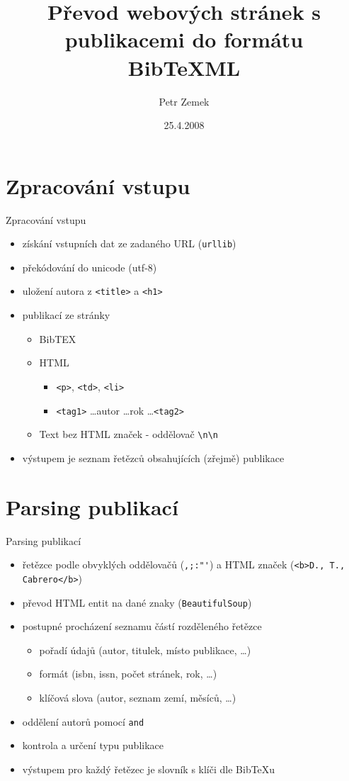 \documentclass{beamer}
\title[Jak jsem řešil projekt do předmětu ISJ \hspace*{7em} \insertframenumber/
\inserttotalframenumber]{Převod webových stránek s publikacemi do formátu BibTeXML}
\author[Petr Zemek]
{
	Petr Zemek
}
\institute
{
	Aneb jak jsem řešil projekt do předmětu ISJ...
}
\date{25.4.2008}
\begin{document}
\begin{frame}
	\titlepage
\end{frame}

\section{Zpracování vstupu}

\begin{frame}[fragile]{Zpracování vstupu}
\begin{itemize}
	\item získání vstupních dat ze zadaného URL (\verb!urllib!)
	\item překódování do unicode (utf-8)
	\item uložení autora z \verb!<title>! a \verb!<h1>!
	\item {} publikací ze stránky
		\begin{itemize}
			\item BibTEX
			\item HTML
				\begin{itemize}
					\item \verb!<p>!, \verb!<td>!, \verb!<li>!
					\item \verb!<tag1>! \dots autor \dots rok \dots \verb!<tag2>!
				\end{itemize}
			\item Text bez HTML značek - oddělovač \verb!\n\n!
		\end{itemize}
	\item výstupem je seznam řetězců obsahujících (zřejmě) publikace
\end{itemize}
\end{frame}

\section{Parsing publikací}

\begin{frame}[fragile]{Parsing publikací}
\begin{itemize}
	\item {} řetězce podle obvyklých oddělovačů (\verb!,;:"'!)
		a HTML značek (\verb!<b>D., T., Cabrero</b>!)
	\item převod HTML entit na dané znaky (\verb!BeautifulSoup!)
	\item postupné procházení seznamu částí rozděleného řetězce
		\begin{itemize}
			\item pořadí údajů (autor, titulek, místo publikace, \dots)
			\item formát (isbn, issn, počet stránek, rok, \dots)
			\item klíčová slova (autor, seznam zemí, měsíců, \dots)
		\end{itemize}
	\item oddělení autorů pomocí \verb!and!
	\item kontrola  a určení typu publikace
	\item výstupem pro každý řetězec je slovník s klíči dle BibTeXu
\end{itemize}
\end{frame}
\end{document}

